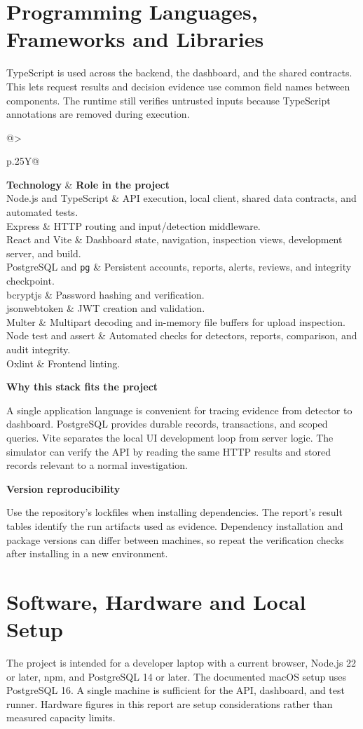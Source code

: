 \documentclass[11pt,a4paper,oneside]{report}
\makeatletter
\newcommand{\topic}[1]{\smallskip\noindent\textbf{#1}\par\nobreak\vspace{-.39em}}
\newcommand{\casecode}[1]{\texttt{#1}}
\newcommand{\sheet}[1]{\clearpage\section{#1}}
\newcommand{\tabletitle}[1]{\captionof{table}{#1}\smallskip}
\newcommand{\bodytable}[1]{\begin{tabularx}{\linewidth}{@{}>{\raggedright\arraybackslash}p{.25\linewidth}Y@{}}\toprule #1\bottomrule\end{tabularx}}
\makeatother
\begin{document}
\section{Programming Languages, Frameworks and Libraries}
TypeScript is used across the backend, the dashboard, and the shared contracts. This lets request results and decision evidence use common field names between components. The runtime still verifies untrusted inputs because TypeScript annotations are removed during execution.

\tabletitle{Technologies and their roles}
\bodytable{\textbf{Technology} & \textbf{Role in the project}\\\midrule
Node.js and TypeScript & API execution, local client, shared data contracts, and automated tests.\\
Express & HTTP routing and input/detection middleware.\\
React and Vite & Dashboard state, navigation, inspection views, development server, and build.\\
PostgreSQL and \casecode{pg} & Persistent accounts, reports, alerts, reviews, and integrity checkpoint.\\
bcryptjs & Password hashing and verification.\\
jsonwebtoken & JWT creation and validation.\\
Multer & Multipart decoding and in-memory file buffers for upload inspection.\\
Node test and assert & Automated checks for detectors, reports, comparison, and audit integrity.\\
Oxlint & Frontend linting.\\}

\topic{Why this stack fits the project}
A single application language is convenient for tracing evidence from detector to dashboard. PostgreSQL provides durable records, transactions, and scoped queries. Vite separates the local UI development loop from server logic. The simulator can verify the API by reading the same HTTP results and stored records relevant to a normal investigation.

\topic{Version reproducibility}
Use the repository's lockfiles when installing dependencies. The report's result tables identify the run artifacts used as evidence. Dependency installation and package versions can differ between machines, so repeat the verification checks after installing in a new environment.

\sheet{Software, Hardware and Local Setup}
The project is intended for a developer laptop with a current browser, Node.js 22 or later, npm, and PostgreSQL 14 or later. The documented macOS setup uses PostgreSQL 16. A single machine is sufficient for the API, dashboard, and test runner. Hardware figures in this report are setup considerations rather than measured capacity limits.
\end{document}
